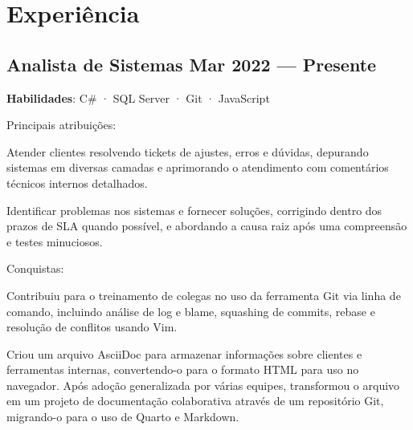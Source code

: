 \section{Experiência}

\subsection{Analista de Sistemas \hfill Mar 2022 --- Presente}
\vspace{.8em}
\textbf{Habilidades}: C\# · SQL Server · Git · JavaScript

\vspace{.7em}
Principais atribuições:
\vspace{-.5em}
\begin{zitemize}
  \item
    Atender clientes resolvendo tickets de ajustes, erros e dúvidas, depurando sistemas em diversas camadas e aprimorando o atendimento com comentários técnicos internos detalhados.
  \vspace{.1em}
  \item
    Identificar problemas nos sistemas e fornecer soluções, corrigindo dentro dos prazos de SLA quando possível, e abordando a causa raiz após uma compreensão e testes minuciosos.
\end{zitemize}

\vspace{.7em}
Conquistas:
\vspace{-.5em}
\begin{zitemize}
  \item
    Contribuiu para o treinamento de colegas no uso da ferramenta Git via linha de comando, incluindo análise de log e blame, squashing de commits, rebase e resolução de conflitos usando Vim.
  \vspace{.1em}
  \item
    Criou um arquivo AsciiDoc para armazenar informações sobre clientes e ferramentas internas, convertendo-o para o formato HTML para uso no navegador. Após adoção generalizada por várias equipes, transformou o arquivo em um projeto de documentação colaborativa através de um repositório Git, migrando-o para o uso de Quarto e Markdown.
\end{zitemize}

